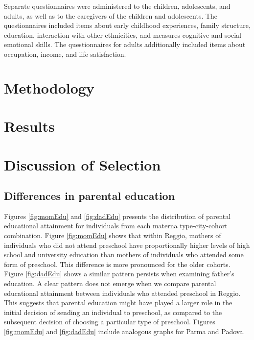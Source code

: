 Separate questionnaires were administered to the children, adolescents, and adults, as well as to the caregivers of the children and adolescents. The questionnaires included items about early childhood experiences, family structure, education, interaction with other ethnicities, and measures cognitive and social-emotional skills. The questionnaires for adults additionally included items about occupation, income, and life satisfaction. 

\section{Methodology}
\label{sec:methodology}



\section{Results}
\label{sec:results}

\section{Discussion of Selection}
\label{sec:selection}

\subsection{Differences in parental education}

Figures \ref{fig:momEdu} and \ref{fig:dadEdu} presents the distribution of parental educational attainment for individuals from each materna type-city-cohort combination. Figure \ref{fig:momEdu} shows that within Reggio, mothers of individuals who did not attend preschool have proportionally higher levels of high school and university education than mothers of individuals who attended some form of preschool. This difference is more pronounced for the older cohorts. Figure \ref{fig:dadEdu} shows a similar pattern persists when examining father's education. A clear pattern does not emerge when we compare parental educational attainment between individuals who attended preschool in Reggio. This suggests that parental education might have played a larger role in the initial decision of sending an individual to preschool, as compared to the subsequent decision of choosing a particular type of preschool. Figures \ref{fig:momEdu} and \ref{fig:dadEdu} include analogous graphs for Parma and Padova.

